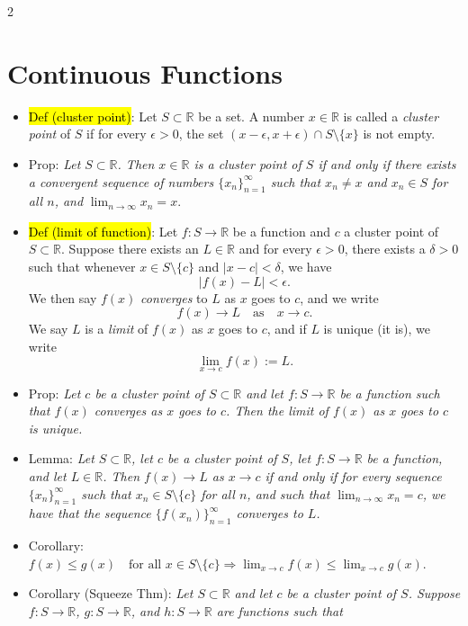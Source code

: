 \documentclass[a4paper,10pt]{article}
\begin{document}
\begin{multicols}{2}
\section*{Continuous Functions}
\begin{itemize}
    \item \hl{Def (cluster point)}: Let \( S \subset \mathbb{R} \) be a set. A number \( x \in \mathbb{R} \) is called a \textit{cluster point} of \( S \) if for every \( \epsilon > 0 \), the set \( (x - \epsilon, x + \epsilon) \cap S \setminus \{x\} \) is not empty.
    \item Prop: \textit{Let \( S \subset \mathbb{R} \). Then \( x \in \mathbb{R} \) is a cluster point of \( S \) if and only if there exists a convergent sequence of numbers \( \{x_n\}_{n=1}^{\infty} \) such that \( x_n \neq x \) and \( x_n \in S \) for all \( n \), and} $\lim_{n \to \infty} x_n = x.$
    \item \hl{Def (limit of function)}: Let \( f: S \to \mathbb{R} \) be a function and \( c \) a cluster point of \( S \subset \mathbb{R} \). Suppose there exists an \( L \in \mathbb{R} \) and for every \( \epsilon > 0 \), there exists a \( \delta > 0 \) such that whenever \( x \in S \setminus \{c\} \) and \( |x - c| < \delta \), we have\[|f(x) - L| < \epsilon.\]We then say \( f(x) \) \textit{converges} to \( L \) as \( x \) goes to \( c \), and we write\[f(x) \to L \quad \text{as} \quad x \to c.\]We say \( L \) is a \textit{limit} of \( f(x) \) as \( x \) goes to \( c \), and if \( L \) is unique (it is), we write\[\lim_{x \to c} f(x) := L.\]
    \item Prop: \textit{Let \( c \) be a cluster point of \( S \subset \mathbb{R} \) and let \( f: S \to \mathbb{R} \) be a function such that \( f(x) \) converges as \( x \) goes to \( c \). Then the limit of \( f(x) \) as \( x \) goes to \( c \) is unique.}
    \item Lemma: \textit{Let \( S \subset \mathbb{R} \), let \( c \) be a cluster point of \( S \), let \( f: S \to \mathbb{R} \) be a function, and let \( L \in \mathbb{R} \). Then \( f(x) \to L \) as \( x \to c \) if and only if for every sequence \( \{x_n\}_{n=1}^{\infty} \) such that \( x_n \in S \setminus \{c\} \) for all \( n \), and such that \( \lim_{n \to \infty} x_n = c \), we have that the sequence \( \{f(x_n)\}_{n=1}^{\infty} \) converges to \( L \).}
    \item Corollary: $f(x) \leq g(x) \quad \text{for all } x \in S \setminus \{c\}\Rightarrow \lim_{x \to c} f(x) \leq \lim_{x \to c} g(x).$
    \item Corollary (Squeeze Thm): \textit{Let \( S \subset \mathbb{R} \) and let \( c \) be a cluster point of \( S \). Suppose \( f: S \to \mathbb{R} \), \( g: S \to \mathbb{R} \), and \( h: S \to \mathbb{R} \) are functions such that}

\end{itemize}
\end{multicols}
\end{document}

